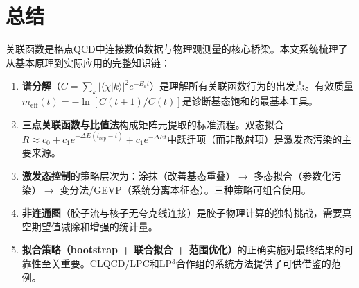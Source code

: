 \documentclass[12pt,a4paper]{ctexart}
\theoremstyle{definition}
\begin{document}
\section{总结}

关联函数是格点QCD中连接数值数据与物理观测量的核心桥梁。本文系统梳理了从基本原理到实际应用的完整知识链：

\begin{enumerate}
    \item \textbf{谱分解}（$C = \sum_k |\langle\chi|k\rangle|^2 e^{-E_k t}$）是理解所有关联函数行为的出发点。有效质量$m_{\text{eff}}(t) = -\ln[C(t+1)/C(t)]$是诊断基态饱和的最基本工具。

    \item \textbf{三点关联函数与比值法}构成矩阵元提取的标准流程。双态拟合$R \approx c_0 + c_1 e^{-\Delta E(t_{\text{sep}}-t)} + c_1 e^{-\Delta E t}$中跃迁项（而非散射项）是激发态污染的主要来源。

    \item \textbf{激发态控制}的策略层次为：涂抹（改善基态重叠）$\to$ 多态拟合（参数化污染）$\to$ 变分法/GEVP（系统分离本征态）。三种策略可组合使用。

    \item \textbf{非连通图}（胶子流与核子无夸克线连接）是胶子物理计算的独特挑战，需要真空期望值减除和增强的统计量。

    \item \textbf{拟合策略（bootstrap + 联合拟合 + 范围优化）}的正确实施对最终结果的可靠性至关重要。CLQCD/LPC和LP$^3$合作组的系统方法提供了可供借鉴的范例。
\end{enumerate}
\end{document}
